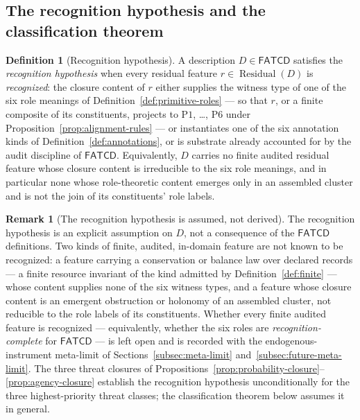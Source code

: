 \documentclass[11pt]{article}
\theoremstyle{definition}
\newtheorem{definition}[theorem]{Definition}
\newtheorem{remark}[theorem]{Remark}
\newcommand{\FATCD}{\ensuremath{\mathsf{FATCD}}}
\newcommand{\Residual}[1]{\ensuremath{\operatorname{Residual}\!\left(#1\right)}}
\newcommand{\Pone}{\ensuremath{\mathrm{P1}}}
\newcommand{\Psix}{\ensuremath{\mathrm{P6}}}
\begin{document}
\subsection{The recognition hypothesis and the classification theorem}\label{subsec:classification-theorem}

\begin{definition}[Recognition hypothesis]\label{def:recognition-hypothesis}
A description \(D \in \FATCD{}\) satisfies the \emph{recognition hypothesis}
when every residual feature \(r \in \Residual{D}\) is \emph{recognized}: the
closure content of \(r\) either supplies the witness type of one of the six
role meanings of Definition~\ref{def:primitive-roles} --- so that \(r\), or a
finite composite of its constituents, projects to \Pone{}, \ldots, \Psix{}
under Proposition~\ref{prop:alignment-rules} --- or instantiates one of the six
annotation kinds of Definition~\ref{def:annotations}, or is substrate already
accounted for by the audit discipline of \FATCD{}. Equivalently, \(D\) carries
no finite audited residual feature whose closure content is irreducible to the
six role meanings, and in particular none whose role-theoretic content emerges
only in an assembled cluster and is not the join of its constituents' role
labels.
\end{definition}

\begin{remark}[The recognition hypothesis is assumed, not derived]\label{rem:recognition-open}
The recognition hypothesis is an explicit assumption on \(D\), not a consequence
of the \FATCD{} definitions. Two kinds of finite, audited, in-domain feature are
not known to be recognized: a feature carrying a conservation or balance law over
declared records --- a finite resource invariant of the kind admitted by
Definition~\ref{def:finite} --- whose content supplies none of the six witness
types, and a feature whose closure content is an emergent obstruction or holonomy
of an assembled cluster, not reducible to the role labels of its constituents.
Whether every finite audited feature is recognized --- equivalently, whether the
six roles are \emph{recognition-complete} for \FATCD{} --- is left open and is
recorded with the endogenous-instrument meta-limit of
Sections~\ref{subsec:meta-limit} and~\ref{subsec:future-meta-limit}. The three
threat closures of
Propositions~\ref{prop:probability-closure}--\ref{prop:agency-closure} establish
the recognition hypothesis unconditionally for the three highest-priority threat
classes; the classification theorem below assumes it in general.
\end{remark}
\end{document}
